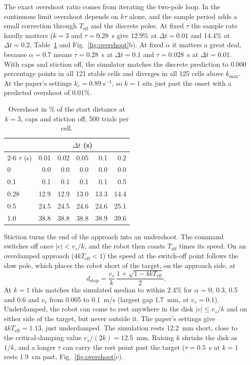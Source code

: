 \documentclass[10pt,letterpaper]{article}
\newcommand{\Teff}{T_{\mathrm{eff}}}
\newcommand{\kmax}{k_{\max}}
\newcommand{\dt}{\Delta t}
\begin{document}
The exact overshoot ratio comes from iterating the two-pole loop. In the continuous limit overshoot depends on $k\tau$ alone, and the sample period adds a small correction through $\Teff$ and the discrete poles. At fixed $\tau$ the sample rate hardly matters ($k = 3$ and $\tau = 0.28$~s give 12.9\% at $\dt = 0.01$ and 14.4\% at $\dt = 0.2$, Table~\ref{tab:overshoot} and Fig.~\ref{fig:overshoot}b). At fixed $\alpha$ it matters a great deal, because $\alpha = 0.7$ means $\tau = 0.28$~s at $\dt = 0.1$ and $\tau = 0.028$~s at $\dt = 0.01$. With caps and stiction off, the simulator matches the discrete prediction to 0.000 percentage points in all 121 stable cells and diverges in all 125 cells above $\kmax$. At the paper's settings $k_c = 0.89~\mathrm{s^{-1}}$, so $k = 1$ sits just past the onset with a predicted overshoot of 0.01\%.

\begin{table}[htbp]
\centering\small
\caption{Overshoot in \% of the start distance at $k = 3$, caps and stiction off, 500 trials per cell.}
\label{tab:overshoot}
\begin{tabular}{@{}l rrrrr@{}}
\toprule
 & \multicolumn{5}{c}{$\dt$ (s)} \\
\cmidrule(l){2-6}
$\tau$ (s) & 0.01 & 0.02 & 0.05 & 0.1 & 0.2 \\
\midrule
0    & 0.0  & 0.0  & 0.0  & 0.0  & 0.0 \\
0.1  & 0.1  & 0.1  & 0.1  & 0.1  & 0.5 \\
0.28 & 12.9 & 12.9 & 13.0 & 13.3 & 14.4 \\
0.5  & 24.5 & 24.5 & 24.6 & 24.6 & 25.1 \\
1.0  & 38.8 & 38.8 & 38.8 & 38.9 & 39.6 \\
\bottomrule
\end{tabular}
\end{table}

Stiction turns the end of the approach into an undershoot. The command switches off once $|e| < v_s/k$, and the robot then coasts $\Teff$ times its speed. On an overdamped approach ($4k\Teff < 1$) the speed at the switch-off point follows the slow pole, which places the robot short of the target, on the approach side, at
\begin{equation}\label{eq:dstop}
d_{\mathrm{stop}} = \frac{v_s}{k}\,\frac{1 + \sqrt{1 - 4k\Teff}}{2}.
\end{equation}
At $k = 1$ this matches the simulated median to within 2.4\% for $\alpha$ = 0, 0.3, 0.5 and 0.6 and $v_s$ from 0.005 to 0.1~m/s (largest gap 1.7~mm, at $v_s = 0.1$). Underdamped, the robot can come to rest anywhere in the disk $|e| \le v_s/k$ and on either side of the target, but never outside it. The paper's settings give $4k\Teff = 1.13$, just underdamped. The simulation rests 12.2~mm short, close to the critical-damping value $v_s/(2k) = 12.5$~mm. Raising $k$ shrinks the disk as $1/k$, and a longer $\tau$ can carry the rest point past the target ($\tau = 0.5$~s at $k = 1$ rests 1.9~cm past, Fig.~\ref{fig:overshoot}c).
\end{document}
